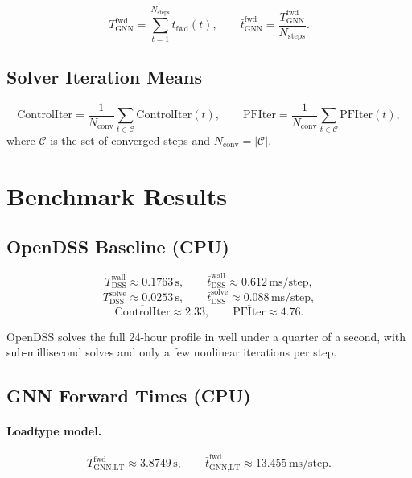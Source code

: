 \documentclass[11pt]{article}
\begin{document}
\[
T^{\text{fwd}}_{\text{GNN}}
  = \sum_{t=1}^{N_{\text{steps}}} t_{\text{fwd}}(t),
\qquad
\bar{t}^{\text{fwd}}_{\text{GNN}}
  = \frac{T^{\text{fwd}}_{\text{GNN}}}{N_{\text{steps}}}.
\]

\subsection{Solver Iteration Means}

\[
\overline{\text{ControlIter}}
  = \frac{1}{N_{\text{conv}}}
    \sum_{t \in \mathcal{C}} \text{ControlIter}(t),
\qquad
\overline{\text{PFIter}}
  = \frac{1}{N_{\text{conv}}}
    \sum_{t \in \mathcal{C}} \text{PFIter}(t),
\]
where $\mathcal{C}$ is the set of converged steps and $N_{\text{conv}} = |\mathcal{C}|$.

\section{Benchmark Results}

\subsection{OpenDSS Baseline (CPU)}

\[
T^{\text{wall}}_{\text{DSS}} \approx 0.1763\,\text{s},
\qquad
\bar{t}^{\text{wall}}_{\text{DSS}} \approx 0.612\,\text{ms/step},
\]
\[
T^{\text{solve}}_{\text{DSS}} \approx 0.0253\,\text{s},
\qquad
\bar{t}^{\text{solve}}_{\text{DSS}} \approx 0.088\,\text{ms/step},
\]
\[
\overline{\text{ControlIter}} \approx 2.33,
\qquad
\overline{\text{PFIter}} \approx 4.76.
\]

OpenDSS solves the full 24-hour profile in well under a quarter of a second, with
sub-millisecond solves and only a few nonlinear iterations per step.

\subsection{GNN Forward Times (CPU)}

\paragraph{Loadtype model.}
\[
T^{\text{fwd}}_{\text{GNN,LT}} \approx 3.8749\,\text{s},
\qquad
\bar{t}^{\text{fwd}}_{\text{GNN,LT}} \approx 13.455\,\text{ms/step}.
\]
\end{document}
